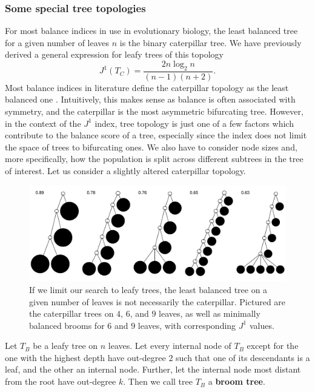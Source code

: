 \subsubsection{Some special tree topologies}
For most balance indices in use in evolutionary biology, the least balanced tree for a given number of leaves $n$ is the binary caterpillar tree. We have previously derived a general expression for leafy trees of this topology \cite{lemant_robust_2021}
\begin{equation}
    J^1(T_C) = \frac{2n\log_2n}{(n-1)(n+2)}.\label{caterpillar}
\end{equation}
Most balance indices in literature define the caterpillar topology as the least balanced one \cite{fischer_tree_2021}. Intuitively, this makes sense as balance is often associated with symmetry, and the caterpillar is the most asymmetric bifurcating tree. However, in the context of the $J^1$ index, tree topology is just one of a few factors which contribute to the balance score of a tree, especially since the index does not limit the space of trees to bifurcating ones. We also have to consider node sizes and, more specifically, how the population is split across different subtrees in the tree of interest. Let us consider a slightly altered caterpillar topology.
\par
\begin{figure}
    \centering
    \includegraphics[width=\textwidth]{Chapter_trees/figures/example_figure_1.pdf}
    \caption{If we limit our search to leafy trees, the least balanced tree on a given number of leaves is not necessarily the caterpillar. Pictured are the caterpillar trees on $4$, $6$, and $9$ leaves, as well as minimally balanced brooms for $6$ and $9$ leaves, with corresponding $J^1$ values.}
    \label{example_figure_1}
\end{figure}

\begin{definition}
    Let $T_B$ be a leafy tree on $n$ leaves. Let every internal node of $T_B$ except for the one with the highest depth have out-degree $2$ such that one of its descendants is a leaf, and the other an internal node. Further, let the internal node most distant from the root have out-degree $k$. Then we call tree $T_B$ a \textbf{broom tree}.
\end{definition}

